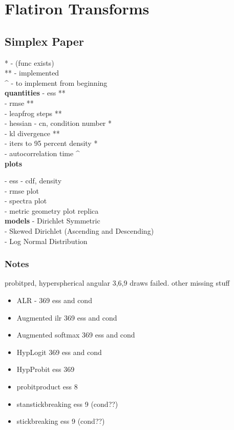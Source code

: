 \section{Flatiron Transforms}

\subsection*{Simplex Paper}
* - (func exists)\\
** - implemented\\
^ - to implement from beginning\\
\textbf{quantities}
- ess **\\
- rmse **\\
- leapfrog steps **\\
- hessian - cn, condition number *\\
- kl divergence **\\
- iters to 95 percent density *\\
- autocorrelation time ^\\

\textbf{plots}

- ess - cdf, density\\
- rmse plot\\
- spectra plot\\
- metric geometry plot replica\\

\textbf{models}
- Dirichlet Symmetric\\
- Skewed Dirichlet (Ascending and Descending)\\
- Log Normal Distribution\\


\subsubsection*{Notes}
probitprd, hyperspherical angular 3,6,9 draws failed. other missing stuff
\begin{itemize}

\item ALR - 369 ess and cond
\item Augmented ilr 369 ess and cond
\item Augmented softmax 369 ess and cond
\item HypLogit 369 ess and cond
\item HypProbit ess 369

\item probitproduct ess 8
\item stanstickbreaking ess 9 (cond??)
\item stickbreaking ess 9 (cond??)
\end{itemize}


